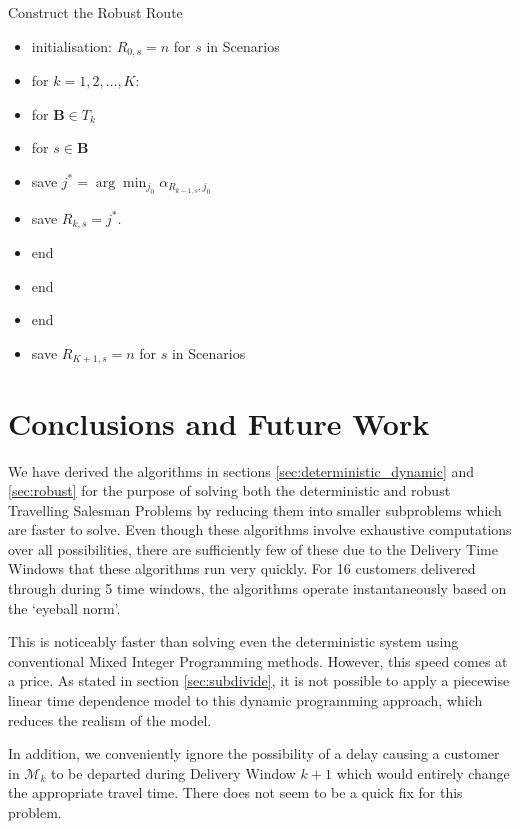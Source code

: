\begin{algorithm}{Construct the Robust Route}{}
	\label{alg:forward_robust_recourse_solution}
	\begin{itemize}
		\item[] initialisation: $R_{0,s} = n$ for $s$ in Scenarios
		\item[] for $k=1, 2, \ldots, K:$
		\item[] \quad for $\mathbf{B} \in T_k$
		\item[] \quad \quad for $s \in \mathbf{B}$
		\item[] \quad\quad\quad save $j^* = \arg\min_{j_0}\alpha_{R_{k-1, s}, j_0} $
		\item[] \quad\quad\quad save $R_{k,s} = j^*$.
		\item[] \quad\quad end
		\item[] \quad end
		\item[] end
		\item[] save $R_{K+1, s} = n$ for $s$ in Scenarios
	\end{itemize}
\end{algorithm}


\section{Conclusions and Future Work}
We have derived the algorithms in sections \ref{sec:deterministic_dynamic} and
\ref{sec:robust} for the purpose of solving both the deterministic and robust Travelling Salesman Problems by reducing them into smaller subproblems which are faster to solve. Even though these algorithms involve exhaustive computations over all possibilities, there are sufficiently few of these due to the Delivery Time Windows that these algorithms run very quickly. For 16 customers delivered through during 5 time windows, the algorithms operate instantaneously based on the `eyeball norm'.

This is noticeably faster than solving even the deterministic system using conventional Mixed Integer Programming methods. However, this speed comes at a price. As stated in section \ref{sec:subdivide}, it is not possible to apply a piecewise linear time dependence model to this dynamic programming approach, which reduces the realism of the model. 

In addition, we conveniently ignore the possibility of a delay causing a customer in $\mathcal{M}_k$ to be departed during Delivery Window $k+1$ which would entirely change the appropriate travel time. There does not seem to be a quick fix for this problem.

